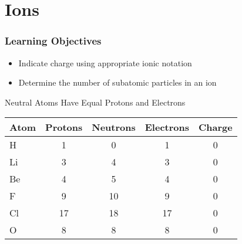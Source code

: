 \documentclass[notes=only]{beamer}
\begin{document}
%

\section{Ions}

\begin{frame}
	\frametitle{Learning Objectives}

	\begin{itemize}
		\item Indicate charge using appropriate ionic notation
		\item Determine the number of subatomic particles in an ion
	\end{itemize}
\end{frame}


\begin{frame}{Neutral Atoms Have Equal Protons and Electrons}

	\begin{center}
	\begin{tabular} {l *{4}{c}}
		\toprule
		\bfseries Atom & \bfseries Protons & \bfseries Neutrons &
		\bfseries Electrons & \bfseries Charge     \\ \midrule
		H    & 1       & 0        & 1         & 0          \\
		Li   & 3       & 4        & 3         & 0          \\
		Be   & 4       & 5        & 4         & 0          \\
		F    & 9       & 10       & 9         & 0          \\
		Cl   & 17      & 18       & 17        & 0          \\
		O    & 8       & 8        & 8         & 0          \\
		\bottomrule
	\end{tabular}
	\end{center}
\end{frame}
\end{document}
